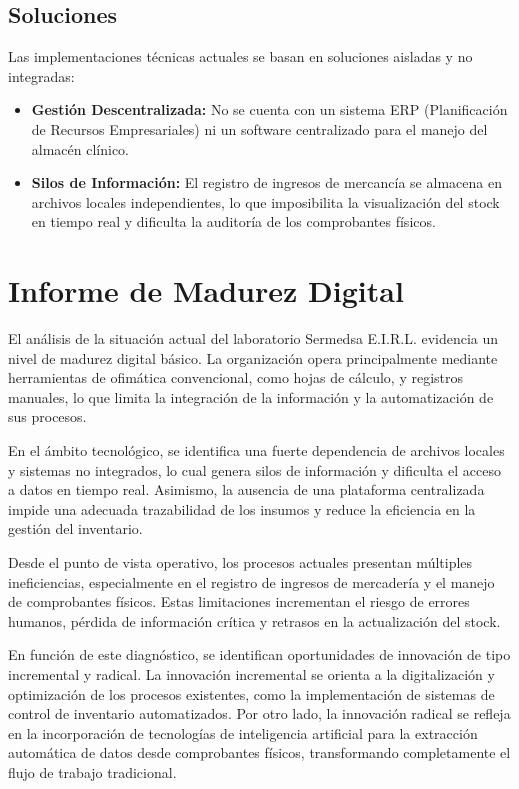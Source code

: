 \documentclass[12pt,a4paper]{article}
\begin{document}
\subsection{Soluciones}
Las implementaciones técnicas actuales se basan en soluciones aisladas y no integradas:
\begin{itemize}

    \item \textbf{Gestión Descentralizada:} No se cuenta con un sistema ERP (Planificación de Recursos Empresariales) ni un software centralizado para el manejo del almacén clínico.
    \item \textbf{Silos de Información:} El registro de ingresos de mercancía se almacena en archivos locales independientes, lo que imposibilita la visualización del stock en tiempo real y dificulta la auditoría de los comprobantes físicos.
\end{itemize}

\section{Informe de Madurez Digital}


El análisis de la situación actual del laboratorio Sermedsa E.I.R.L. evidencia un nivel de madurez digital básico. La organización opera principalmente mediante herramientas de ofimática convencional, como hojas de cálculo, y registros manuales, lo que limita la integración de la información y la automatización de sus procesos.

En el ámbito tecnológico, se identifica una fuerte dependencia de archivos locales y sistemas no integrados, lo cual genera silos de información y dificulta el acceso a datos en tiempo real. Asimismo, la ausencia de una plataforma centralizada impide una adecuada trazabilidad de los insumos y reduce la eficiencia en la gestión del inventario.

Desde el punto de vista operativo, los procesos actuales presentan múltiples ineficiencias, especialmente en el registro de ingresos de mercadería y el manejo de comprobantes físicos. Estas limitaciones incrementan el riesgo de errores humanos, pérdida de información crítica y retrasos en la actualización del stock.

En función de este diagnóstico, se identifican oportunidades de innovación de tipo incremental y radical. La innovación incremental se orienta a la digitalización y optimización de los procesos existentes, como la implementación de sistemas de control de inventario automatizados. Por otro lado, la innovación radical se refleja en la incorporación de tecnologías de inteligencia artificial para la extracción automática de datos desde comprobantes físicos, transformando completamente el flujo de trabajo tradicional.
\end{document}
